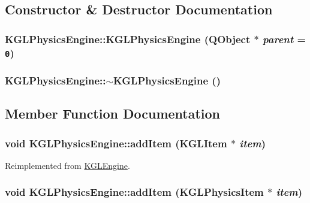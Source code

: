 \subsection{Constructor \& Destructor Documentation}
\hypertarget{class_k_g_l_physics_engine_0818ba02342badbfbe03053d39b90039}{
\subsubsection[{KGLPhysicsEngine}]{\setlength{\rightskip}{0pt plus 5cm}KGLPhysicsEngine::KGLPhysicsEngine (QObject $\ast$ {\em parent} = {\tt 0})}}
\label{class_k_g_l_physics_engine_0818ba02342badbfbe03053d39b90039}


\hypertarget{class_k_g_l_physics_engine_98c83543996d5546657cd66dc9f4e4c5}{
\subsubsection[{$\sim$KGLPhysicsEngine}]{\setlength{\rightskip}{0pt plus 5cm}KGLPhysicsEngine::$\sim$KGLPhysicsEngine ()}}
\label{class_k_g_l_physics_engine_98c83543996d5546657cd66dc9f4e4c5}




\subsection{Member Function Documentation}
\hypertarget{class_k_g_l_physics_engine_eefe31c558a83c43d1840987cdea1898}{
\subsubsection[{addItem}]{\setlength{\rightskip}{0pt plus 5cm}void KGLPhysicsEngine::addItem ({\bf KGLItem} $\ast$ {\em item})}}
\label{class_k_g_l_physics_engine_eefe31c558a83c43d1840987cdea1898}




Reimplemented from \hyperlink{class_k_g_l_engine_4aa9d5809d76cc44994a1cdb9df6f3ec}{KGLEngine}.\hypertarget{class_k_g_l_physics_engine_94a77a670eb52594fa7aa468c3ef9fea}{
\subsubsection[{addItem}]{\setlength{\rightskip}{0pt plus 5cm}void KGLPhysicsEngine::addItem ({\bf KGLPhysicsItem} $\ast$ {\em item})}}
\label{class_k_g_l_physics_engine_94a77a670eb52594fa7aa468c3ef9fea}


